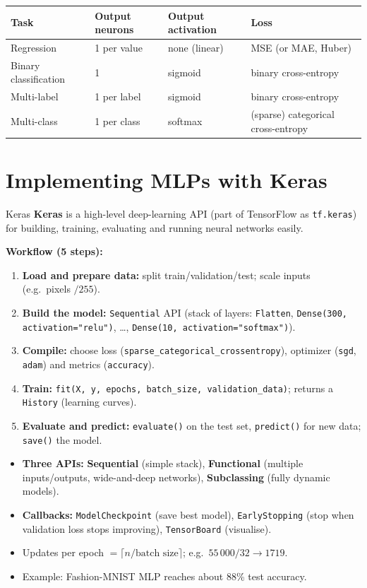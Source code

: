 \begin{center}
\small
\begin{tabular}{@{}p{3.0cm}p{3.2cm}p{3.2cm}p{5.5cm}@{}}
\toprule
\textbf{Task} & \textbf{Output neurons} & \textbf{Output activation} & \textbf{Loss}\\
\midrule
Regression & 1 per value & none (linear) & MSE (or MAE, Huber)\\
Binary classification & 1 & sigmoid & binary cross-entropy\\
Multi-label & 1 per label & sigmoid & binary cross-entropy\\
Multi-class & 1 per class & softmax & (sparse) categorical cross-entropy\\
\bottomrule
\end{tabular}
\end{center}

\section{Implementing MLPs with Keras}
\begin{dfn}{Keras}
\textbf{Keras} is a high-level deep-learning API (part of TensorFlow as \texttt{tf.keras}) for building, training, evaluating and running neural networks easily.
\end{dfn}
\textbf{Workflow (5 steps):}
\begin{enumerate}
  \item \textbf{Load and prepare data:} split train/validation/test; scale inputs (e.g.\ pixels $/255$).
  \item \textbf{Build the model:} \texttt{Sequential} API (stack of layers: \texttt{Flatten}, \texttt{Dense(300, activation="relu")}, \dots, \texttt{Dense(10, activation="softmax")}).
  \item \textbf{Compile:} choose loss (\texttt{sparse\_categorical\_crossentropy}), optimizer (\texttt{sgd}, \texttt{adam}) and metrics (\texttt{accuracy}).
  \item \textbf{Train:} \texttt{fit(X, y, epochs, batch\_size, validation\_data)}; returns a \texttt{History} (learning curves).
  \item \textbf{Evaluate and predict:} \texttt{evaluate()} on the test set, \texttt{predict()} for new data; \texttt{save()} the model.
\end{enumerate}
\begin{itemize}
  \item \textbf{Three APIs:} \textbf{Sequential} (simple stack), \textbf{Functional} (multiple inputs/outputs, wide-and-deep networks), \textbf{Subclassing} (fully dynamic models).
  \item \textbf{Callbacks:} \texttt{ModelCheckpoint} (save best model), \texttt{EarlyStopping} (stop when validation loss stops improving), \texttt{TensorBoard} (visualise).
  \item Updates per epoch $=\lceil n/\text{batch size}\rceil$; e.g.\ $55\,000/32\to1719$.
  \item Example: Fashion-MNIST MLP reaches about 88\% test accuracy.
\end{itemize}

